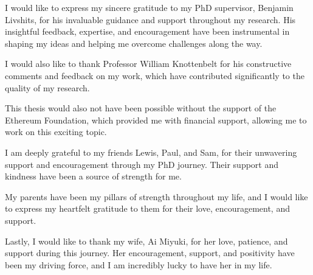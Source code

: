 \cleardoublepage

\begin{acknowledgements}
	I would like to express my sincere gratitude to my PhD supervisor, Benjamin Livshits, for his invaluable guidance and support throughout my research. His insightful feedback, expertise, and encouragement have been instrumental in shaping my ideas and helping me overcome challenges along the way.

	I would also like to thank Professor William Knottenbelt for his constructive comments and feedback on my work, which have contributed significantly to the quality of my research.

	This thesis would also not have been possible without the support of the Ethereum Foundation, which provided me with financial support, allowing me to work on this exciting topic.

	I am deeply grateful to my friends Lewis, Paul, and Sam, for their unwavering support and encouragement through my PhD journey.
	Their support and kindness have been a source of strength for me.

	My parents have been my pillars of strength throughout my life, and I would like to express my heartfelt gratitude to them for their love, encouragement, and support.

	Lastly, I would like to thank my wife, Ai Miyuki, for her love, patience, and support during this journey.
	Her encouragement, support, and positivity have been my driving force, and I am incredibly lucky to have her in my life.
\end{acknowledgements}
